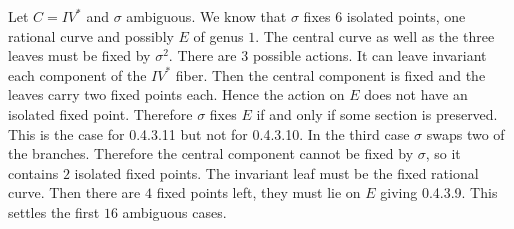 Let $C = IV^*$ and $\sigma$ ambiguous. We know that $\sigma$ fixes $6$ isolated points, one rational curve and possibly $E$ of genus $1$.
The central curve as well as the three leaves must be fixed by $\sigma^2$. There are $3$ possible actions.
It can leave invariant each component of the $IV^*$ fiber. Then the central component is fixed and the leaves carry two fixed points each. Hence the action on $E$ does not have an isolated fixed point. Therefore $\sigma$ fixes $E$ if and only if some section is preserved. This is the case for 0.4.3.11 but not for 0.4.3.10.
In the third case $\sigma$ swaps two of the branches. Therefore the central component cannot be fixed by $\sigma$, so it contains $2$ isolated fixed points.
The invariant leaf must be the fixed rational curve. Then there are $4$ fixed points left, they must lie on $E$ giving 0.4.3.9.
This settles the first $16$ ambiguous cases.

